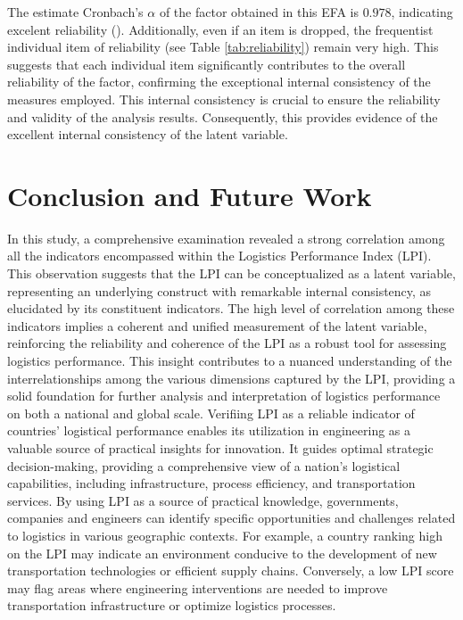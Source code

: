 \documentclass[sigconf]{acmart}
\begin{document}
The estimate Cronbach's $\alpha$ of the factor obtained in this EFA is $0.978$, indicating excelent reliability (\cite{pestana2008analise}). Additionally, even if an item is dropped, the frequentist individual item of reliability (see Table \ref{tab:reliability}) remain very high. This suggests that each individual item significantly contributes to the overall reliability of the factor, confirming the exceptional internal consistency of the measures employed. This internal consistency is crucial to ensure the reliability and validity of the analysis results. 
Consequently, this provides evidence of the excellent internal consistency of the latent variable.


\section{Conclusion and Future Work}

In this study, a comprehensive examination revealed a strong correlation among all the indicators encompassed within the Logistics Performance Index (LPI). This observation suggests that the LPI can be conceptualized as a latent variable, representing an underlying construct with remarkable internal consistency, as elucidated by its constituent indicators. The high level of correlation among these indicators implies a coherent and unified measurement of the latent variable, reinforcing the reliability and coherence of the LPI as a robust tool for assessing logistics performance. This insight contributes to a nuanced understanding of the interrelationships among the various dimensions captured by the LPI, providing a solid foundation for further analysis and interpretation of logistics performance on both a national and global scale.
Verifiing LPI as a reliable indicator of countries' logistical performance enables its utilization in engineering as a valuable source of practical insights for innovation. It guides optimal strategic decision-making, providing a comprehensive view of a nation's logistical capabilities, including infrastructure, process efficiency, and transportation services. By using LPI as a source of practical knowledge, governments, companies and engineers can identify specific opportunities and challenges related to logistics in various geographic contexts. For example, a country ranking high on the LPI may indicate an environment conducive to the development of new transportation technologies or efficient supply chains. Conversely, a low LPI score may flag areas where engineering interventions are needed to improve transportation infrastructure or optimize logistics processes.
\end{document}

